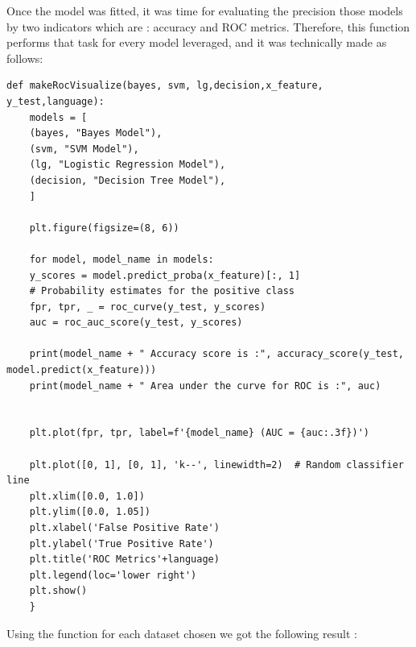 \documentclass[12pt,a4paper, oneside]{book}
\begin{document}
Once the model was fitted, it was time for evaluating the precision those models by two indicators which are : accuracy and ROC metrics. Therefore, this function performs that task for every model leveraged, and it was technically made as follows: 
\begin{lstlisting}[style=stylejupyter]
def makeRocVisualize(bayes, svm, lg,decision,x_feature, y_test,language):
	models = [
	(bayes, "Bayes Model"),
	(svm, "SVM Model"),
	(lg, "Logistic Regression Model"),
	(decision, "Decision Tree Model"),
	]
	
	plt.figure(figsize=(8, 6))
	
	for model, model_name in models:
	y_scores = model.predict_proba(x_feature)[:, 1]  
	# Probability estimates for the positive class
	fpr, tpr, _ = roc_curve(y_test, y_scores)
	auc = roc_auc_score(y_test, y_scores)
	
	print(model_name + " Accuracy score is :", accuracy_score(y_test, model.predict(x_feature)))
    print(model_name + " Area under the curve for ROC is :", auc) 

	
	plt.plot(fpr, tpr, label=f'{model_name} (AUC = {auc:.3f})')
	
	plt.plot([0, 1], [0, 1], 'k--', linewidth=2)  # Random classifier line
	plt.xlim([0.0, 1.0])
	plt.ylim([0.0, 1.05])
	plt.xlabel('False Positive Rate')
	plt.ylabel('True Positive Rate')
	plt.title('ROC Metrics'+language)
	plt.legend(loc='lower right')
	plt.show()
	}
\end{lstlisting}
Using the function for each dataset chosen we got the following result :
\end{document}
